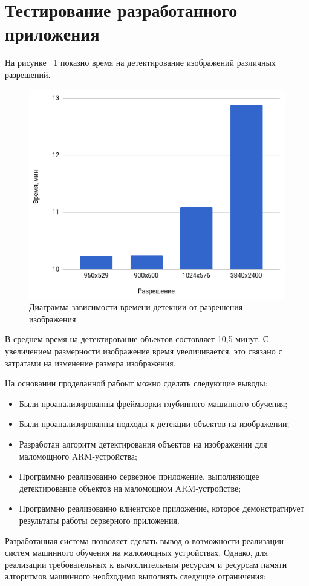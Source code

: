 \documentclass[a4paper,english,russian]{G2-105}
\begin{document}
\section{Тестирование разработанного приложения}
\par На рисунке ~\ref{timedetection} показно время на детектирование изображений различных разрешений.
\begin{figure}
    \includegraphics[width=0.6\linewidth]{timedetection.png}
    \caption{Диаграмма зависимости времени детекции от разрешения изображения}
	\label{timedetection}
\end{figure}
\par В среднем время на детектирование объектов состовляет 10,5 минут. С увеличением размерности изображение время увеличивается, это связано с затратами на изменение размера изображения.
\newpage
{}
\par На основании проделанной рабоыт можно сделать следующие выводы:
\begin{itemize}
\item Были проанализированны фреймворки глубинного машинного обучения;
\item Были проанализированны подходы к детекции объектов на изображении;
\item Разработан алгоритм детектирования объектов на изображении для маломощного ARM-устройства;
\item Программно реализованно серверное приложение, выполняющее детектирование объектов на маломощном ARM-устройстве;
\item Программно реализованно клиентское приложение, которое демонстратирует результаты работы серверного приложения.
\end{itemize}
\par Разработанная система позволяет сделать вывод о возможности реализации систем машинного обучения на маломощных устройствах. Однако, для реализации требовательных к вычислительным ресурсам и ресурсам памяти алгоритмов машинного необходимо выполнять следущие ограничения:
\end{document}
